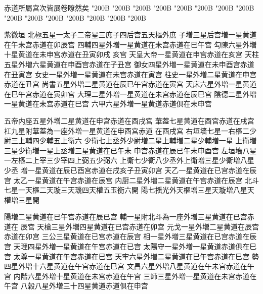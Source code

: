\begin{正文}
\par
赤道所屬宫次皆展卷瞭然矣
\char"200B\relax{}
\char"200B\relax{}
\char"200B\relax{}
\char"200B\relax{}
\char"200B\relax{}
\char"200B\relax{}
\char"200B\relax{}
\char"200B\relax{}
\char"200B\relax{}
\char"200B\relax{}
\char"200B\relax{}
\char"200B\relax{}
\char"200B\relax{}
\char"200B\relax{}
\char"200B\relax
\par
紫微垣
北極五星一太子二帝星三庶子四后宫五天樞外庶
子増三星后宫増一星黄道在午未宫赤道在卯辰宫
四輔四星外増一星黄道在未宫赤道在已午宫
勾陳六星外増十星黄道在未申宫赤道在丑寅卯戌
亥宫
天皇大帝一星黄道在申宫赤道在亥宫
天柱五星外増六星黄道在申酉宫赤道在子丑宫
御女四星外増一星黄道在未申酉宫赤道在丑寅宫
女史一星外増一星黄道在未宫赤道在寅宫
柱史一星外増二星黄道在申宫赤道在丑宫
尚書五星外増二星黄道在辰已午宫赤道在寅宫
天床六星外増一星黄道在巳午宫赤道在寅卯宫
大理二星外増一星黄道在未宫赤道在辰巳宫
陰德二星外増一星黄道在未宫赤道在巳宫
六甲六星外増一星黄道赤道俱在未申宫
\par
五帝内座五星外増二星黄道在申宫赤道在酉戌宫
華葢七星黄道在酉宫赤道在戌宫
杠九星附華葢為一座外増一星黄道在申酉宫赤道
在酉戌宫
右垣墻七星一右樞二少尉三上輔四少輔五上衛六
少衛七上丞外少尉増二星上輔増二星少輔増一星
上衛増三星少衛増一星上丞増三星黄道在已午未
申宫赤道在辰已午未申酉宫
左垣墻八星一左樞二上宰三少宰四上弼五少弼六
上衛七少衛八少丞外上衛増三星少衛増八星少丞
増一星黄道在辰已酉宫赤道在戌亥子丑寅卯宫
天乙一星黄道在已宫赤道在辰宫
太乙一星黄道在午宫赤道在辰宫
内厨二星外増二星黄道在午宫赤道在辰宫
北斗七星一天樞二天璇三天璣四天權五玉衡六開
陽七揺光外天樞増三星天璇増八星天權増三星開
\par
陽増二星黄道在已午宫赤道在辰已宫
輔一星附北斗為一座外増三星黄道在已宫赤道在
辰宫
天槍三星外増四星黄道在已宫赤道在卯宫
元戈一星外増二星黄道在辰宫赤道在卯宫
三公三星黄道在已宫赤道在辰宫
相一星外増三星黄道在已宫赤道在辰宫
天理四星外増一星黄道在午宫赤道在已宫
太陽守一星外増一星黄道赤道俱在巳宫
太尊一星黄道在午宫赤道在巳宫
天牢六星外増二星黄道在巳午宫赤道在巳宫
勢四星外増十六星黄道在午宫赤道在巳宫
文昌六星外増八星黄道在午未宫赤道在午宫
内階六星外増十星黄道在未宫赤道在午宫
三師三星外増一星黄道在未宫赤道在午宫
八榖八星外増三十四星黄道赤道俱在申宫
\par

\end{正文}
